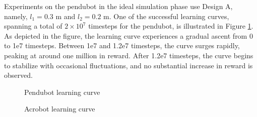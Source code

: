 Experiments on the pendubot in the ideal simulation phase use Design A, namely, \( l_1 = 0.3 \) m and \( l_2 = 0.2 \) m. One of the successful learning curves, spanning a total of \( 2 \times 10^7 \) timesteps for the pendubot, is illustrated in Figure \ref{fig:pendubot_learning_curve_ideal}. As depicted in the figure, the learning curve experiences a gradual ascent from 0 to 1e7 timesteps. Between 1e7 and 1.2e7 timesteps, the curve surges rapidly, peaking at around one million in reward. After 1.2e7 timesteps, the curve begins to stabilize with occasional fluctuations, and no substantial increase in reward is observed.

\begin{figure}[H]
    \centering
    \caption{Pendubot learning curve}
    \label{fig:pendubot_learning_curve_ideal}
\end{figure}

\begin{figure}[H]
    \centering
    \caption{Acrobot learning curve}
    \label{fig:acrobot_learning_curve_ideal}
\end{figure}

